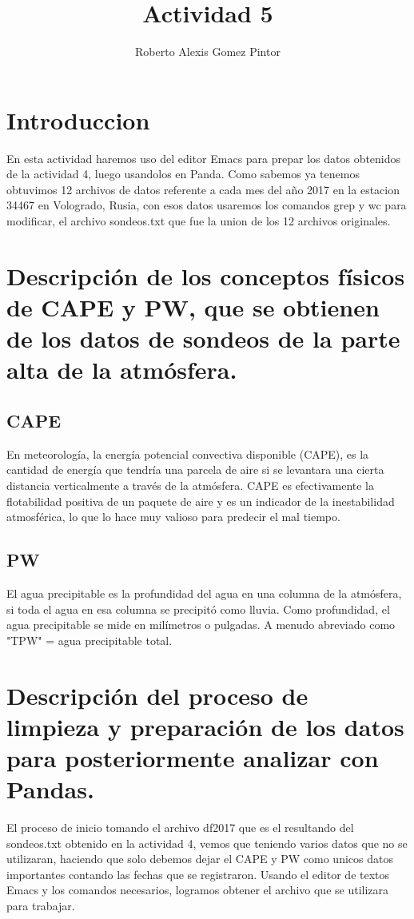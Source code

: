 \documentclass{article}
\title{Actividad 5}
\author{Roberto Alexis Gomez Pintor}
\begin{document}
\maketitle
\section{Introduccion}
En esta actividad haremos uso del editor Emacs para prepar los datos obtenidos de la actividad 4, luego usandolos en Panda. Como sabemos ya tenemos obtuvimos 12 archivos de datos referente a cada mes del año 2017 en la estacion 34467 en Vologrado, Rusia, con esos datos usaremos los comandos grep y wc para modificar, el archivo sondeos.txt que fue la union de los 12 archivos originales.
\section{Descripción de los conceptos físicos de CAPE y PW, que se obtienen de los datos de sondeos de la parte alta de la atmósfera.}
\subsection{CAPE}
En meteorología, la energía potencial convectiva disponible (CAPE), es la cantidad de energía que tendría una parcela de aire si se levantara una cierta distancia verticalmente a través de la atmósfera. CAPE es efectivamente la flotabilidad positiva de un paquete de aire y es un indicador de la inestabilidad atmosférica, lo que lo hace muy valioso para predecir el mal tiempo. 
\subsection{PW}
El agua precipitable es la profundidad del agua en una columna de la atmósfera, si toda el agua en esa columna se precipitó como lluvia. Como profundidad, el agua precipitable se mide en milímetros o pulgadas. A menudo abreviado como "TPW" = agua precipitable total.
\section{Descripción del proceso de limpieza y preparación de los datos para posteriormente analizar con Pandas.}
El proceso de inicio tomando el archivo df2017 que es el resultando del sondeos.txt obtenido en la actividad 4, vemos que teniendo varios datos que no se utilizaran, haciendo que solo debemos dejar el CAPE y PW como unicos datos importantes contando las fechas que se registraron. Usando el editor de textos Emacs y los comandos necesarios, logramos obtener el archivo que se utilizara para trabajar.
\end{document}
